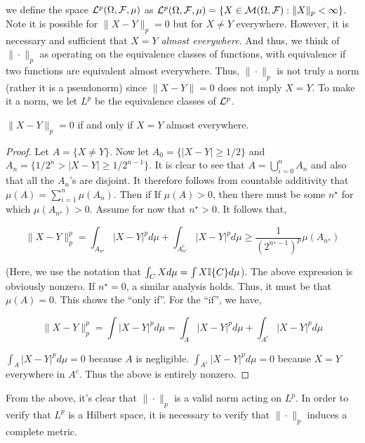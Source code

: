     we define the space $\mathcal L^p(\Omega, \mathcal F, \mu)$ as $\mathcal L^p(\Omega, \mathcal F, \mu) = \{X \in \mathcal M(\Omega, \mathcal F) : \|X\|_p < \infty\}$. Note it is possible for $\|X - Y\|_p = 0$ but for $X \neq Y$ everywhere. However, 
    it is necessary and sufficient that $X = Y$ \emph{almost everywhere}. And thus, 
    we think of $\|\cdot\|_p$ as operating on the equivalence classes of 
    functions, with equivalence if two functions are equivalent almost everywhere. Thus, 
    $\|\cdot\|_p$ is not truly a norm (rather it is a pseudonorm) since 
    $\|X-Y\| = 0$ does not imply $X = Y$. To make it a norm, we let 
    $L^p$ be the equivalence classes of $\mathcal L^p$.

    \begin{theorem}
        $\|X-Y\|_p = 0$ if and only if $X = Y$ almost everywhere.
    \end{theorem}
    \begin{proof}
        Let $A = \{X \neq Y\}$. Now let $A_0=\{|X-Y| \geq 1/2\}$ and $A_n = \{1/2^n > |X - Y| \geq 1/2^{n-1}\}$. It is clear to see that 
        $A = \bigcup_{i=0}^n A_n$ and also that all the $A_n$'s are disjoint. It therefore follows 
        from countable additivity that $\mu(A) = \sum_{i=1}^n \mu(A_n)$. Then if 
        If $\mu(A) > 0$, then there must be some $n^\star$ for which $\mu(A_{n^\star}) > 0$.
        Assume for now that $n^\star > 0$. It follows that, 

        \[ \|X-Y\|_p^p = \int_{A_{n^\star}} |X-Y|^pd\mu + \int_{A_{n^\star}^c} |X-Y|^p d\mu \geq \frac{1}{(2^{n^\star - 1})^p}\mu(A_{n^\star})  \]

        (Here, we use the notation that $\int_C Xd\mu = \int X \mathbb I\{C\}d\mu$). 
        The above expression is obviously nonzero. If $n^\star = 0$, a similar analysis 
        holds. Thus, it must be that $\mu(A) = 0$. This shows the ``only if''. For the ``if'', we have,

        \[ \|X-Y\|_p^p = \int |X-Y|^p d\mu =  \int_A |X-Y|^p d\mu + \int_{A^c} |X-Y|^p d\mu\]

        $\int_A |X-Y|^p d\mu = 0$ because $A$ is negligible. $\int_{A^c} |X-Y|^p d\mu = 0$ because 
        $X=Y$ everywhere in $A^c$. Thus the above is entirely nonzero. 
    \end{proof}

    From the above, it's clear that $\|\cdot\|_p$ is a valid norm acting on $L^p$. In order to verify that 
    $L^p$ is a Hilbert space, it is necessary to verify that $\|\cdot\|_p$ induces a complete metric. 

